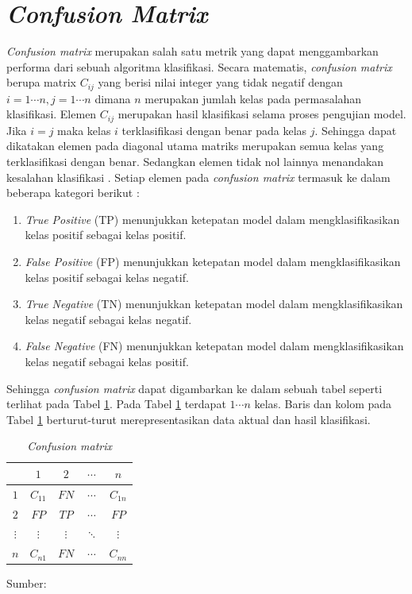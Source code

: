 \section{\textit{Confusion Matrix}}
\textit{Confusion matrix} merupakan salah satu metrik yang dapat menggambarkan performa dari sebuah algoritma klasifikasi. Secara matematis, \textit{confusion matrix} berupa matrix $C_{ij}$ yang berisi nilai integer yang tidak negatif dengan $i=1\cdots n,j=1\cdots n$ dimana $n$ merupakan jumlah kelas pada permasalahan klasifikasi. Elemen $C_{ij}$ merupakan hasil klasifikasi selama proses pengujian model. Jika $i=j$ maka kelas $i$ terklasifikasi dengan benar pada kelas $j$. Sehingga dapat dikatakan elemen pada diagonal utama matriks merupakan semua kelas yang terklasifikasi dengan benar. Sedangkan elemen tidak nol lainnya menandakan kesalahan klasifikasi \citep{Susmaga2004}. Setiap elemen pada \textit{confusion matrix} termasuk ke dalam beberapa kategori berikut \citep{Shultz2017}:
\begin{enumerate}
    \item \textit{True Positive} (TP) menunjukkan ketepatan model dalam mengklasifikasikan kelas positif sebagai kelas positif.
    \item \textit{False Positive} (FP) menunjukkan ketepatan model dalam mengklasifikasikan kelas positif sebagai kelas negatif.
    \item \textit{True Negative} (TN) menunjukkan ketepatan model dalam mengklasifikasikan kelas negatif sebagai kelas negatif.
    \item \textit{False Negative} (FN) menunjukkan ketepatan model dalam mengklasifikasikan kelas negatif sebagai kelas positif.
\end{enumerate}

Sehingga \textit{confusion matrix} dapat digambarkan ke dalam sebuah tabel seperti terlihat pada Tabel \ref{tab:conf-mat}. Pada Tabel \ref{tab:conf-mat} terdapat $1\cdots n$ kelas. Baris dan kolom pada Tabel \ref{tab:conf-mat} berturut-turut merepresentasikan data aktual dan hasil klasifikasi.

\begin{table}[H]
    \caption{\textit{Confusion matrix}}
    \centering
    \begin{tabular}{|c|c|c|c|c|}
        \hline
        \           &$1$        &$2$        &$\cdots$   &$n$\\
        \hline
        $1$         &$C_{11}$   &$FN$       &$\cdots$   &$C_{1n}$\\
        \hline
        $2$         &$FP$       &$TP$       &$\cdots$   &$FP$\\
        \hline
        $\vdots$    &$\vdots$   &$\vdots$   &$\ddots$   &$\vdots$\\
        \hline
        $n$         &$C_{n1}$   &$FN$       &$\cdots$   &$C_{nn}$\\
        \hline
    \end{tabular}

    \label{tab:conf-mat}
    Sumber: \citep{Shultz2017}
\end{table}

